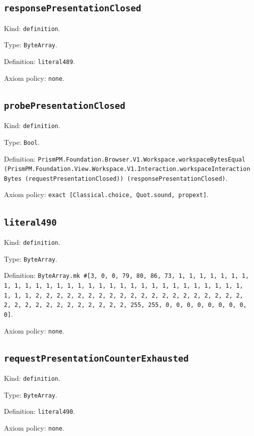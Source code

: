 \documentclass[11pt]{article}
\begin{document}
\subsection*{\texttt{responsePresentationClosed}}
\noindent Kind: \texttt{definition}.\par
\noindent Type: \texttt{ByteArray}.\par
\noindent Definition: \texttt{literal489}.\par
\noindent Axiom policy: \texttt{none}.\par
\subsection*{\texttt{probePresentationClosed}}
\noindent Kind: \texttt{definition}.\par
\noindent Type: \texttt{Bool}.\par
\noindent Definition: \texttt{PrismPM.Foundation.Browser.V1.Workspace.workspaceBytesEqual (PrismPM.Foundation.View.Workspace.V1.Interaction.workspaceInteractionBytes (requestPresentationClosed)) (responsePresentationClosed)}.\par
\noindent Axiom policy: \texttt{exact [Classical.choice, Quot.sound, propext]}.\par
\subsection*{\texttt{literal490}}
\noindent Kind: \texttt{definition}.\par
\noindent Type: \texttt{ByteArray}.\par
\noindent Definition: \texttt{ByteArray.mk \#[3, 0, 0, 79, 80, 86, 73, 1, 1, 1, 1, 1, 1, 1, 1, 1, 1, 1, 1, 1, 1, 1, 1, 1, 1, 1, 1, 1, 1, 1, 1, 1, 1, 1, 1, 1, 1, 1, 1, 1, 2, 2, 2, 2, 2, 2, 2, 2, 2, 2, 2, 2, 2, 2, 2, 2, 2, 2, 2, 2, 2, 2, 2, 2, 2, 2, 2, 2, 2, 2, 2, 2, 255, 255, 0, 0, 0, 0, 0, 0, 0, 0, 0]}.\par
\noindent Axiom policy: \texttt{none}.\par
\subsection*{\texttt{requestPresentationCounterExhausted}}
\noindent Kind: \texttt{definition}.\par
\noindent Type: \texttt{ByteArray}.\par
\noindent Definition: \texttt{literal490}.\par
\noindent Axiom policy: \texttt{none}.\par
\end{document}
